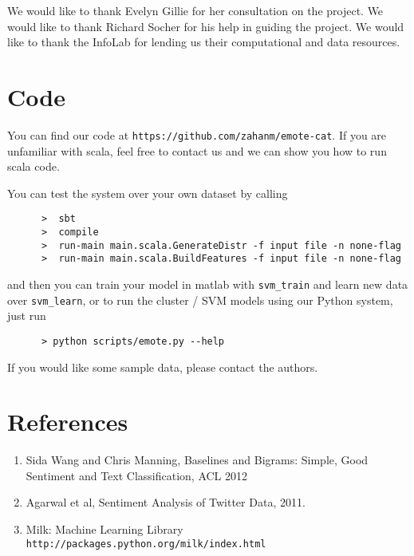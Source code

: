 \documentclass[11pt]{article}
\begin{document}
We would like to thank Evelyn Gillie for her consultation on the project. We would like to thank Richard Socher for his help in guiding the project. We would like to thank the InfoLab for lending us their computational and data resources.

\section{Code}

You can find our code at \verb|https://github.com/zahanm/emote-cat|. If you are unfamiliar with scala, feel free to contact us and we can show you how to run scala code.

You can test the system over your own dataset by calling
\begin{lstlisting}
      >  sbt
      >  compile 
      >  run-main main.scala.GenerateDistr -f input file -n none-flag 
      >  run-main main.scala.BuildFeatures -f input file -n none-flag
\end{lstlisting}

and then you can train your model in matlab with \verb|svm_train| and learn new data over \verb|svm_learn|, or to run the cluster / SVM models using our Python system, just run
\begin{lstlisting}
      > python scripts/emote.py --help
\end{lstlisting}

If you would like some sample data, please contact the authors.

\section{References}
\begin{enumerate}
\item Sida Wang and Chris Manning, Baselines and Bigrams: Simple, Good Sentiment and Text Classification, ACL 2012
\item Agarwal et al, Sentiment Analysis of Twitter Data, 2011.
\item Milk: Machine Learning Library \verb|http://packages.python.org/milk/index.html|
\end{enumerate}
\end{document}
